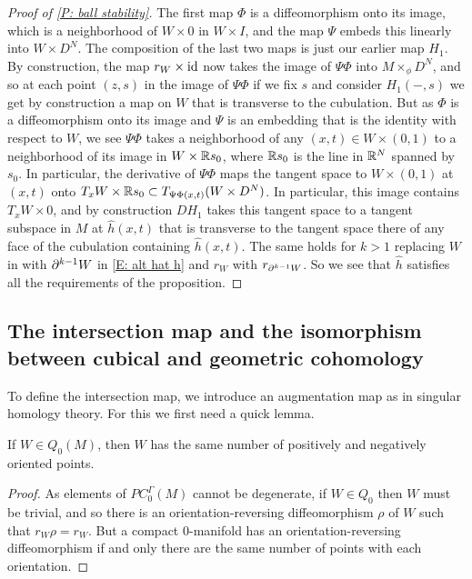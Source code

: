 \begin{proof}[Proof of \cref{P: ball stability}]
The first map $\Phi$ is a diffeomorphism onto its image, which is a neighborhood of $W \times 0$ in $W \times I$, and the map $\Psi$ embeds this linearly into $W \times D^N$. The composition of the last two maps is just our earlier map $H_1$. By construction, the map $r_W \times \mathrm{id}$ now takes the image of $\Psi\Phi$ into $M\times_\phi D^N$, and so at each point $(z,s)$ in the image of $\Psi\Phi$ if we fix $s$ and consider $H_1(-,s)$ we get by construction a map on $W$ that is transverse to the cubulation. But as $\Phi$ is a diffeomorphism onto its image and $\Psi$ is an embedding that is the identity with respect to $W$, we see $\Psi\Phi$ takes a neighborhood of any $(x,t) \in W \times (0,1)$ to a neighborhood of its image in $W \times \mathbb{R} s_0$, where $\mathbb{R} s_0$ is the line in $\mathbb{R}^N$ spanned by $s_0$. In particular, the derivative of $\Psi\Phi$ maps the tangent space to $W \times (0,1)$ at $(x,t)$ onto $ T_xW \times \mathbb{R} s_0 \subset T_{\Psi\Phi(x,t)}(W \times D^N)$. In particular, this image contains $T_xW \times 0$, and by construction $DH_1$ takes this tangent space to a tangent subspace in $M$ at $\hat h(x,t)$ that is transverse to the tangent space there of any face of the cubulation containing $\hat h(x,t)$. The same holds for $k>1$ replacing $W$ in with $\partial^{k-1}W$ in \eqref{E: alt hat h} and $r_W$ with $r_{\partial^{k-1}W}$. So we see that $\hat h$ satisfies all the requirements of the proposition.
\end{proof}

\subsection{The intersection map and the isomorphism between cubical and geometric cohomology}\label{S: intersection map}

To define the intersection map, we introduce an augmentation map as in singular homology theory. For this we first need a quick lemma.

\begin{lemma}\label{L: Q0}
If $W \in Q_0(M)$, then $W$ has the same number of positively and negatively oriented points.
\end{lemma}
\begin{proof}
 As elements of $PC_0^\Gamma(M)$ cannot be degenerate, if $W \in Q_0$ then $W$ must be trivial, and so there is an orientation-reversing diffeomorphism $\rho$ of $W$ such that $r_W\rho = r_W$. But a compact $0$-manifold has an orientation-reversing diffeomorphism if and only there are the same number of points with each orientation.
\end{proof}

